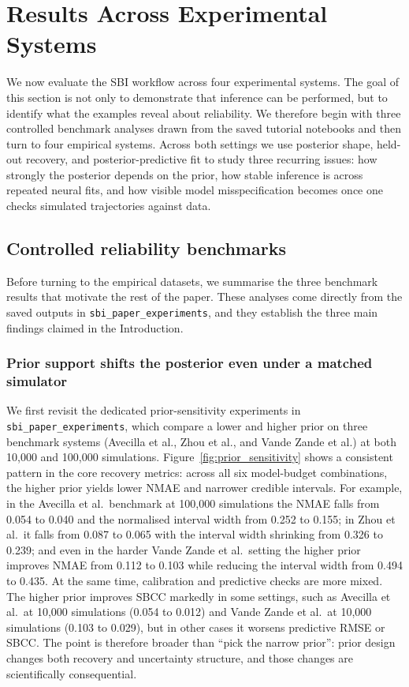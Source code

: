\documentclass[11pt]{article}
\begin{document}
\section{Results Across Experimental Systems}
\label{sec:applications}

We now evaluate the SBI workflow across four experimental systems.
The goal of this section is not only to demonstrate that inference can be
performed, but to identify what the examples reveal about reliability.
We therefore begin with three controlled benchmark analyses drawn from the
saved tutorial notebooks and then turn to four empirical systems.
Across both settings we use posterior shape, held-out recovery, and
posterior-predictive fit to study three recurring issues:
how strongly the posterior depends on the prior, how stable inference is
across repeated neural fits, and how visible model misspecification becomes
once one checks simulated trajectories against data.

\subsection{Controlled reliability benchmarks}
\label{sec:reliability_benchmarks}

Before turning to the empirical datasets, we summarise the three benchmark
results that motivate the rest of the paper.
These analyses come directly from the saved outputs in
\texttt{sbi\_paper\_experiments}, and they establish the three main findings
claimed in the Introduction.

\subsubsection{Prior support shifts the posterior even under a matched simulator}

We first revisit the dedicated prior-sensitivity experiments in
\texttt{sbi\_paper\_experiments}, which compare a lower and higher prior on
three benchmark systems (Avecilla et al., Zhou et al., and Vande Zande et al.) at both
10,000 and 100,000 simulations.
Figure~\ref{fig:prior_sensitivity} shows a consistent pattern in the core
recovery metrics:
across all six model-budget combinations, the higher prior yields lower NMAE
and narrower credible intervals.
For example, in the Avecilla et al.\ benchmark at 100,000 simulations the NMAE falls
from 0.054 to 0.040 and the normalised interval width from 0.252 to 0.155;
in Zhou et al.\ it falls from 0.087 to 0.065 with the interval width shrinking from
0.326 to 0.239; and even in the harder Vande Zande et al.\ setting the higher prior
improves NMAE from 0.112 to 0.103 while reducing the interval width from
0.494 to 0.435.
At the same time, calibration and predictive checks are more mixed.
The higher prior improves SBCC markedly in some settings, such as Avecilla et al.\ at
10,000 simulations (0.054 to 0.012) and Vande Zande et al.\ at 10,000 simulations
(0.103 to 0.029), but in other cases it worsens predictive RMSE or SBCC.
The point is therefore broader than ``pick the narrow prior'':
prior design changes both recovery and uncertainty structure, and those
changes are scientifically consequential.
\end{document}
